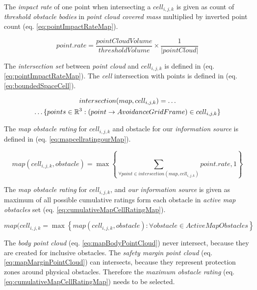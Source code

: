 \noindent The \emph{impact rate} of one point  when intersecting a $cell_{i,j,k}$ is given as count of \emph{threshold obstacle bodies} in \emph{point cloud covered mass} multiplied by inverted point count (eq. \ref{eq:pointImpactRateMap}).

\begin{equation}\label{eq:pointImpactRateMap}
    point. rate = \frac{point Cloud Volume}{threshold Volume}\times\frac{1}{|point Cloud|}
\end{equation}

The \emph{intersection set} between \emph{point cloud} and $cell_{i,j,k}$ is defined in (eq. \ref{eq:pointImpactRateMap}). The \emph{cell} intersection with points is defined in (eq. \ref{eq:boundedSpaceCell}).

\begin{multline}\label{eq:pointcloudIntersectionMap}
    intersection(map,cell_{i,j,k}) =\dots\\\dots \{points \in \mathbb{R}^3: (point\to Avoidance Grid Frame) \in cell_{i,j,k}\}
\end{multline}

\noindent The \emph{map obstacle rating} for $cell_{i,j,k}$ and obstacle for our \emph{information source} is defined in (eq. \ref{eq:mapcellratingourMap}).

\begin{equation}\label{eq:mapcellratingourMap}
    map(cell_{i,j,k},obstacle) =\max\left\{ \sum_{\forall point\in intersection(map,cell_{i,j,k})}  point.rate , 1\right\}
\end{equation}

\noindent The \emph{map obstacle rating} for $cell_{i,j,k}$, and \emph{our information source} is given as maximum of all possible cumulative ratings form each obstacle in \emph{active map obstacles} set (eq. \ref{eq:cumulativeMapCellRatingMap}).

\begin{equation}\label{eq:cumulativeMapCellRatingMap}
    map(cell_{i,j,k} = \max \left\{map(cell_{i,j,k},obstacle):\forall obstacle \in Active Map Obstacles\right\}
\end{equation}

\begin{note}
    The \emph{body point cloud} (eq. \ref{eq:mapBodyPointCloud}) never intersect, because they are created for inclusive obstacles. The \emph{safety margin point cloud} (eq. \ref{eq:mapMarginPointCloud}) can intersects, because they represent protection zones around physical obstacles. Therefore the \emph{maximum obstacle rating} (eq. \ref{eq:cumulativeMapCellRatingMap}) needs to be selected.
\end{note}
